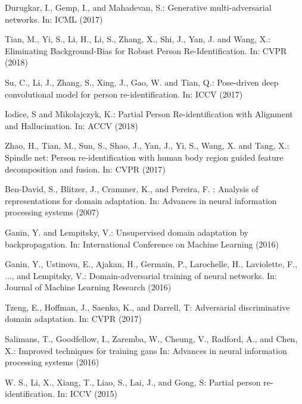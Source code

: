 \documentclass[10pt,twocolumn,letterpaper]{article}
\begin{document}
\begin{thebibliography}{8}
\newblock Durugkar, I., Gemp, I., and Mahadevan, S.:
\newblock Generative multi-adversarial networks.
\newblock In: ICML (2017)


\newblock Tian, M., Yi, S., Li, H., Li, S., Zhang, X., Shi, J., Yan, J. and Wang, X.:
\newblock Eliminating Background-Bias for Robust Person Re-Identification.
\newblock In: CVPR (2018)


\newblock Su, C., Li, J., Zhang, S., Xing, J., Gao, W. and Tian, Q.:
\newblock Pose-driven deep convolutional model for person re-identification.
\newblock In: ICCV (2017)


\newblock Iodice, S and Mikolajczyk, K.:
\newblock Partial Person Re-identification with Alignment and Hallucination.
\newblock In: ACCV (2018)

\newblock Zhao, H., Tian, M., Sun, S., Shao, J., Yan, J., Yi, S., Wang, X. and Tang, X.:
\newblock Spindle net: Person re-identification with human body region guided feature decomposition and fusion.
\newblock In: CVPR (2017)


\newblock Ben-David, S., Blitzer, J., Crammer, K., and Pereira, F. :
\newblock Analysis of representations for domain adaptation.
\newblock In: Advances in neural information processing systems (2007)

\newblock Ganin, Y. and Lempitsky, V.:
\newblock Unsupervised domain adaptation by backpropagation.
\newblock In: International Conference on Machine Learning (2016)

\newblock Ganin, Y., Ustinova, E., Ajakan, H., Germain, P., Larochelle, H., Laviolette, F., ..., and Lempitsky, V.:
\newblock Domain-adversarial training of neural networks.
\newblock In: Journal of Machine Learning Research (2016)

\newblock Tzeng, E., Hoffman, J., Saenko, K., and Darrell, T:
\newblock Adversarial discriminative domain adaptation.
\newblock In: CVPR (2017)


\newblock Salimans, T., Goodfellow, I., Zaremba, W., Cheung, V., Radford, A., and Chen, X.:
\newblock Improved techniques for training gans
\newblock In: Advances in neural information processing systems (2016)


\newblock W. S., Li, X., Xiang, T., Liao, S., Lai, J., and Gong, S:
\newblock Partial person re-identification.
\newblock In: ICCV (2015)





\end{thebibliography}
\end{document}
